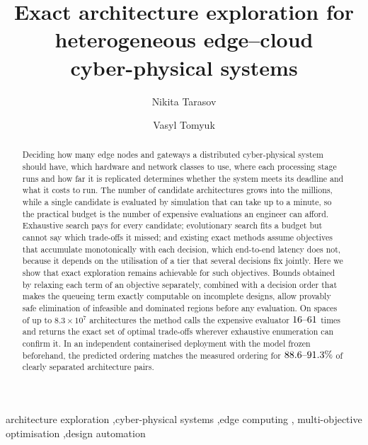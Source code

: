 \documentclass[preprint,11pt,3p]{elsarticle}
\theoremstyle{plain}
\theoremstyle{definition}
\begin{document}
\begin{frontmatter}

\title{Exact architecture exploration for heterogeneous edge--cloud\\
cyber-physical systems}

\author[lp]{Nikita Tarasov}
\author[lp]{Vasyl Tomyuk}
\address[lp]{Lviv Polytechnic National University, Lviv, Ukraine}

\begin{abstract}
Deciding how many edge nodes and gateways a distributed cyber-physical system should
have, which hardware and network classes to use, where each processing stage runs and how
far it is replicated determines whether the system meets its deadline and what it costs
to run. The number of candidate architectures grows into the millions, while a single
candidate is evaluated by simulation that can take up to a minute, so the practical
budget is the number of expensive evaluations an engineer can afford. Exhaustive search
pays for every candidate; evolutionary search fits a budget but cannot say which
trade-offs it missed; and existing exact methods assume objectives that accumulate
monotonically with each decision, which end-to-end latency does not, because it depends
on the utilisation of a tier that several decisions fix jointly. Here we show that exact
exploration remains achievable for such objectives. Bounds obtained by relaxing each term
of an objective separately, combined with a decision order that makes the queueing term
exactly computable on incomplete designs, allow provably safe elimination of infeasible
and dominated regions before any evaluation. On spaces of up to $8.3\times10^{7}$
architectures the method calls the expensive evaluator $16\text{--}61$ times and returns the
exact set of optimal trade-offs wherever exhaustive enumeration can confirm it. In an
independent containerised deployment with the model frozen beforehand, the predicted
ordering matches the measured ordering for $88.6\text{--}91.3\%$ of clearly separated
architecture pairs.
\end{abstract}

\begin{keyword}
architecture exploration \sep cyber-physical systems \sep edge computing \sep
multi-objective optimisation \sep design automation
\end{keyword}

\end{frontmatter}


\end{document}
